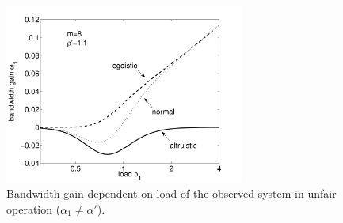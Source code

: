 \begin{figure}[tb]
	\centering
	\includegraphics[width=0.7\textwidth]{aggregation/performance_model/figures/fp_bwgain_prio11}
 	\caption{Bandwidth gain dependent on load of the observed system in unfair operation ($\alpha_1 \neq \alpha'$).}
 	\label{fig:fp_bwgain_prio11}
\end{figure}


